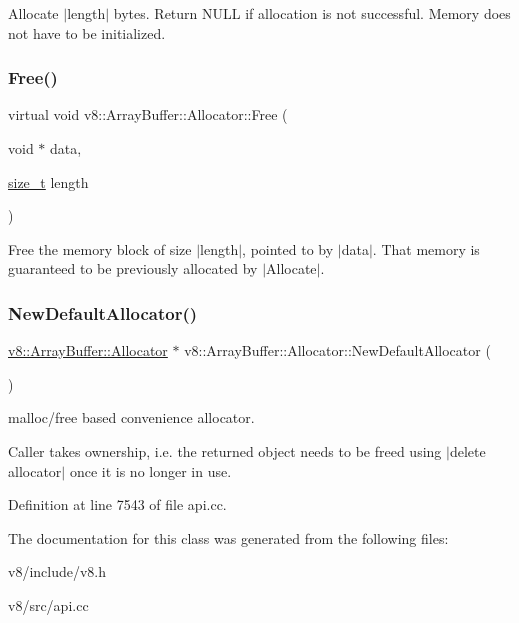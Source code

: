 Allocate $\vert$length$\vert$ bytes. Return N\+U\+LL if allocation is not successful. Memory does not have to be initialized. \mbox{\label{classv8_1_1ArrayBuffer_1_1Allocator_a419f59d2a103a5a8863809d7977c9cd8}} 
\subsubsection{\texorpdfstring{Free()}{Free()}}
{\footnotesize\ttfamily virtual void v8\+::\+Array\+Buffer\+::\+Allocator\+::\+Free (\begin{DoxyParamCaption}\item[{void $\ast$}]{data,  }\item[{\mbox{\hyperlink{classsize__t}{size\+\_\+t}}}]{length }\end{DoxyParamCaption})\hspace{0.3cm}{\ttfamily [pure virtual]}}

Free the memory block of size $\vert$length$\vert$, pointed to by $\vert$data$\vert$. That memory is guaranteed to be previously allocated by $\vert$\+Allocate$\vert$. \mbox{\label{classv8_1_1ArrayBuffer_1_1Allocator_a2c95b1213b0a0a2996e1c63194fc6951}} 
\subsubsection{\texorpdfstring{New\+Default\+Allocator()}{NewDefaultAllocator()}}
{\footnotesize\ttfamily \mbox{\hyperlink{classv8_1_1ArrayBuffer_1_1Allocator}{v8\+::\+Array\+Buffer\+::\+Allocator}} $\ast$ v8\+::\+Array\+Buffer\+::\+Allocator\+::\+New\+Default\+Allocator (\begin{DoxyParamCaption}{ }\end{DoxyParamCaption})\hspace{0.3cm}{\ttfamily [static]}}

malloc/free based convenience allocator.

Caller takes ownership, i.\+e. the returned object needs to be freed using $\vert$delete allocator$\vert$ once it is no longer in use. 

Definition at line 7543 of file api.\+cc.



The documentation for this class was generated from the following files\+:\begin{DoxyCompactItemize}
\item 
v8/include/v8.\+h\item 
v8/src/api.\+cc\end{DoxyCompactItemize}
